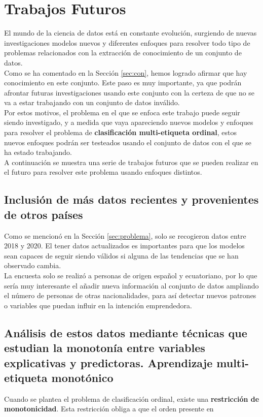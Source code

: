 \chapter{Trabajos Futuros}
El mundo de la ciencia de datos está en constante evolución, surgiendo de nuevas investigaciones modelos nuevos y diferentes enfoques para resolver todo tipo de problemas relacionados con la extracción de conocimiento de un conjunto de datos.\\
\linebreak
Como se ha comentado en la Sección \ref{sec:con}, hemos logrado afirmar que hay conocimiento en este conjunto. Este paso es muy importante, ya que podrán afrontar futuras investigaciones usando este conjunto con la certeza de que no se va a estar trabajando con un conjunto de datos inválido.\\
\linebreak
Por estos motivos, el problema en el que se enfoca este trabajo puede seguir siendo investigado, y a medida que vaya apareciendo nuevos modelos y enfoques para resolver el problema de\textbf{ clasificación multi-etiqueta ordinal}, estos nuevos enfoques podrán ser testeados usando el conjunto de datos con el que se ha estado trabajando.\\
\linebreak
A continuación se muestra una serie de trabajos futuros que se pueden realizar en el futuro para resolver este problema usando enfoques distintos.
\section*{Inclusión de más datos recientes y provenientes de otros países} 
Como se mencionó en la Sección \ref{sec:problema}, solo se recogieron datos entre 2018 y 2020. El tener datos actualizados es importantes para que los modelos sean capaces de seguir siendo válidos si alguna de las tendencias que se han observado cambia.\\
\linebreak
La encuesta solo se realizó a personas de origen español y ecuatoriano, por lo que sería muy interesante el añadir nueva información al conjunto de datos ampliando el número de personas de otras nacionalidades, para así detectar nuevos patrones o variables que puedan influir en la intención emprendedora.
\section*{Análisis de estos datos mediante técnicas que estudian la monotonía entre variables explicativas y predictoras. Aprendizaje multi-etiqueta monotónico}
Cuando se plantea el problema de clasificación ordinal, existe una \textbf{restricción de monotonicidad}. Esta restricción obliga a que el orden presente en
